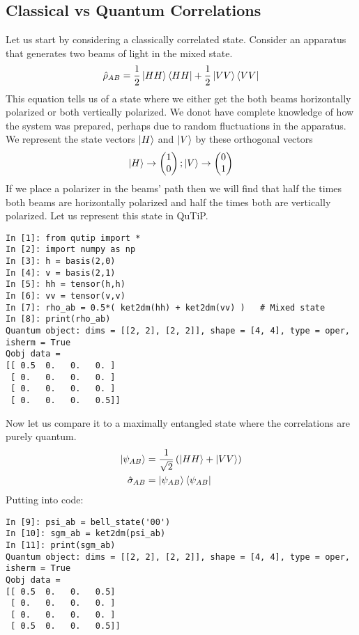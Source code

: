 \subsection{Classical vs Quantum Correlations}
Let us start by considering a classically correlated state. Consider an apparatus that generates two beams of light in the mixed state.
\begin{align}
\hat{\rho}_{AB} = \frac{1}{2} \ket{HH} \bra{HH} + \frac{1}{2} \ket{VV} \bra{VV}
\end{align}
This equation tells us of a state where we either get the both beams horizontally polarized or both vertically polarized. We donot have complete knowledge of how the system was prepared, perhaps due to random fluctuations in the apparatus.
\\ We represent the state vectors $\ket{H}$ and $\ket{V}$ by these orthogonal vectors
\begin{align*}
\ket{H} \rightarrow \begin{pmatrix} 1\\0 \end{pmatrix} ; \ket{V} \rightarrow \begin{pmatrix} 0\\1 \end{pmatrix}
\end{align*}
If we place a polarizer in the beams' path then we will find that half the times both beams are horizontally polarized and half the times both are vertically polarized. Let us represent this state in QuTiP.
\begin{verbatim}
In [1]: from qutip import *
In [2]: import numpy as np
In [3]: h = basis(2,0)
In [4]: v = basis(2,1)
In [5]: hh = tensor(h,h)
In [6]: vv = tensor(v,v)
In [7]: rho_ab = 0.5*( ket2dm(hh) + ket2dm(vv) )   # Mixed state
In [8]: print(rho_ab)
Quantum object: dims = [[2, 2], [2, 2]], shape = [4, 4], type = oper, 
isherm = True
Qobj data =
[[ 0.5  0.   0.   0. ]
 [ 0.   0.   0.   0. ]
 [ 0.   0.   0.   0. ]
 [ 0.   0.   0.   0.5]]
\end{verbatim}
\par Now let us compare it to a maximally entangled state where the correlations are purely quantum.
\begin{align*}
\ket{\psi_{AB}} &= \frac{1}{\sqrt{2}} \left( \ket{HH} + \ket{VV} \right) \\
\hat{\sigma}_{AB} &= \ket{\psi_{AB}} \bra{\psi_{AB}}
\end{align*}
Putting into code:
\begin{verbatim}
In [9]: psi_ab = bell_state('00')
In [10]: sgm_ab = ket2dm(psi_ab)
In [11]: print(sgm_ab)
Quantum object: dims = [[2, 2], [2, 2]], shape = [4, 4], type = oper, isherm = True
Qobj data =
[[ 0.5  0.   0.   0.5]
 [ 0.   0.   0.   0. ]
 [ 0.   0.   0.   0. ]
 [ 0.5  0.   0.   0.5]]
\end{verbatim}
